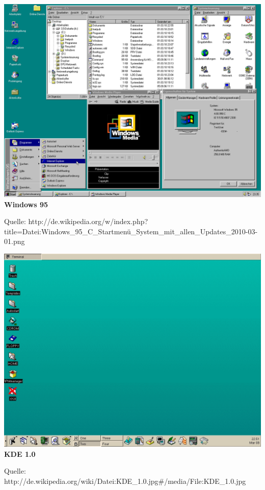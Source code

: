 \documentclass[12pt,a4paper]{report}
\begin{document}
\begin{onehalfspace}
\begin{center}
\includegraphics[scale=0.3]{../docs/lyaton/graphics/Windows-95.png}\\
\textbf{Windows 95}\\
\begin{scriptsize}
Quelle: http://de.wikipedia.org/w/index.php?title=Datei:Windows\_95\_C\_Startmenü\_System\_mit\_allen\_Updates\_2010-03-01.png
\end{scriptsize}
\end{center}

\begin{center}
\includegraphics[scale=0.3]{../docs/lyaton/graphics/KDE_1_0.jpg}\\
\textbf{KDE 1.0}\\
\begin{scriptsize}
Quelle: http://de.wikipedia.org/wiki/Datei:KDE\_1.0.jpg\#/media/File:KDE\_1.0.jpg
\end{scriptsize}
\end{center}


\end{onehalfspace}
\end{document}
